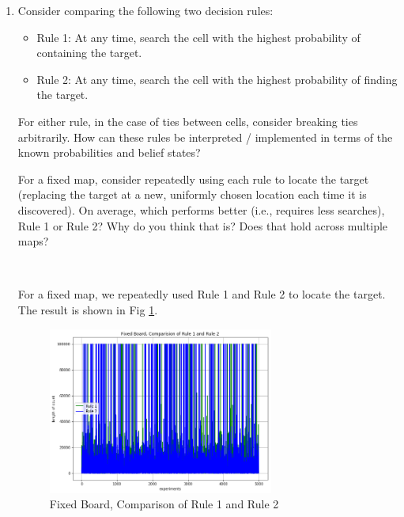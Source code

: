 \documentclass[letter]{article}
\begin{document}
\begin{enumerate}
	\item {Consider comparing the following two decision rules:
		\begin{itemize}
			\item {Rule 1: At any time, search the cell with the highest probability of containing the target.}
			\item {Rule 2: At any time, search the cell with the highest probability of finding the target.}
		\end{itemize} 
		\par{For either rule, in the case of ties between cells, consider breaking ties arbitrarily. How can these rules be interpreted / implemented in terms of the known probabilities and belief states?}
		\par{For a fixed map, consider repeatedly using each rule to locate the target (replacing the target at a new,
			uniformly chosen location each time it is discovered). On average, which performs better (i.e., requires less
			searches), Rule 1 or Rule 2? Why do you think that is? Does that hold across multiple maps?}
		} \\
	
	\par{For a fixed map, we repeatedly used Rule 1 and Rule 2 to locate the target. The result is shown in Fig \ref{fig:xzc1}.}
	
	\begin{figure}
		\centering
		\includegraphics[width=0.7\textwidth]{fig/xzc1.png}
		\caption{Fixed Board, Comparison of Rule 1 and Rule 2}
		\label{fig:xzc1}
	\end{figure}
	

\end{enumerate}
\end{document}
